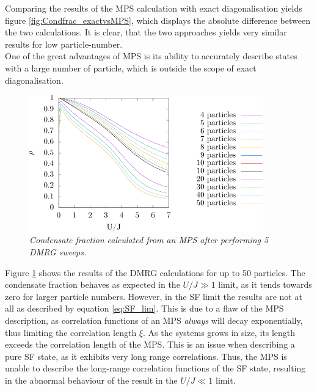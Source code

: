 Comparing the results of the MPS calculation with exact diagonalisation yields figure \ref{fig:Condfrac_exactvsMPS}, which displays the absolute difference between the two calculations. It is clear, that the two approaches yields very similar results for low particle-number.\\
One of the great advantages of MPS is its ability to accurately describe states with a large number of particle, which is outside the scope of exact diagonalisation. 
\begin{figure}[h!]
	\centering
	\includegraphics[width=0.9\textwidth]{Figures/Condfrac_4to50.pdf}
	\caption{\textit{Condensate fraction calculated from an MPS after performing 5 DMRG sweeps.}}
	\label{fig:Condfrac_4to50}
\end{figure}
Figure \ref{fig:Condfrac_4to50} shows the results of the DMRG calculations for up to 50 particles. The condensate fraction behaves as expected in the $U/J \gg 1$ limit, as it tends towards zero for larger particle numbers. However, in the SF limit the results are not at all as described by equation \ref{eq:SF_lim}. This is due to a flaw of the MPS description, as correlation functions of an MPS \textit{always} will decay exponentially, thus limiting the correlation length $\xi$. As the systems grows in size, its length exceeds the correlation length of the MPS. This is an issue when describing a pure SF state, as it exhibits very long range correlations. Thus, the MPS is unable to describe the long-range correlation functions of the SF state, resulting in the abnormal behaviour of the result in the $U/J \ll 1$ limit.